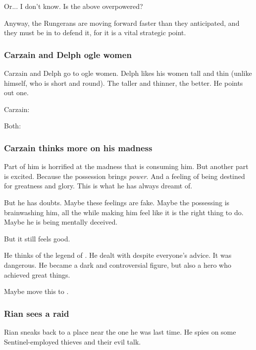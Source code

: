 \begin{garbage}
Or... I don't know. Is the above overpowered? 

Anyway, the Rungerans are moving forward faster than they anticipated, and they must be in \Forklin{} to defend it, for it is a vital strategic point. 





\subsubsection{Carzain and Delph ogle women}
Carzain and Delph go to ogle women. Delph likes his women tall and thin (unlike himself, who is short and round). The taller and thinner, the better. He points out one. 

Carzain: 

Both: 





\subsubsection{Carzain thinks more on his madness}
Part of him is horrified at the madness that is consuming him. 
But another part is excited. 
Because the possession brings \emph{power}. 
And a feeling of being destined for greatness and glory. 
This is what he has always dreamt of. 

But he has doubts. 
Maybe these feelings are fake. 
Maybe the possessing \Archon{} is brainwashing him, all the while making him feel like it is the right thing to do. 
Maybe he is being mentally deceived. 

But it still feels good. 

He thinks of the legend of . 
He dealt with \qliphoth{} despite everyone's advice. 
It was dangerous. 
He became a dark and controversial figure, but also a hero who achieved great things. 

Maybe move this to . 





\subsubsection{Rian sees a raid}
Rian sneaks back to a place near the one he was last time. 
He spies on some Sentinel-employed thieves and their evil talk. 


\end{garbage}
